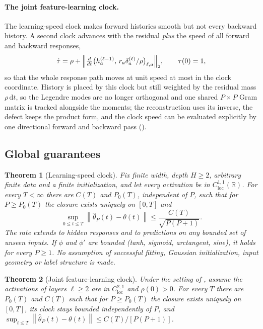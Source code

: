 \documentclass[11pt]{article}
\newtheorem{theorem}{Theorem}[section]
\theoremstyle{definition}
\theoremstyle{remark}
\newcommand{\R}{\mathbb{R}}
\newcommand{\norm}[1]{\left\lVert #1\right\rVert}
\newcommand{\dd}{\,\mathrm{d}}
\begin{document}
\paragraph{The joint feature-learning clock.}
The learning-speed clock makes forward histories smooth but not every backward
history.  A second clock advances with the residual \emph{plus} the speed of all
forward and backward responses,
\begin{equation}
 \dot\tau=\rho+\Bigl\|\tfrac{d}{dt}\bigl(h_a^{(\ell-1)},\,r_a\delta_a^{(\ell)}/\rho\bigr)_{\ell,a}\Bigr\|_2,
 \qquad\tau(0)=1,                                         \label{eq:new-clock}
\end{equation}
so that the whole response path moves at unit speed at most in the clock
coordinate.  History is placed by this clock but still weighted by the residual
mass $\rho\dd t$, so the Legendre modes are no longer orthogonal and one shared
$P\times P$ Gram matrix is tracked alongside the moments; the reconstruction uses
its inverse, the defect keeps the product form, and the clock speed can be
evaluated explicitly by one directional forward and backward pass
().

\subsection{Global guarantees}

\begin{theorem}[Learning-speed clock]
\label{thm:old}
Fix finite width, depth $H\ge2$, arbitrary finite data and a finite
initialization, and let every activation be in $C^{1,1}_{\mathrm{loc}}(\R)$.  For
every $T<\infty$ there are $C(T)$ and $P_0(T)$, independent of $P$, such that for
$P\ge P_0(T)$ the closure exists uniquely on $[0,T]$ and
\[
 \sup_{0\le t\le T}\norm{\widehat\theta_P(t)-\theta(t)}
 \le \frac{C(T)}{\sqrt{P(P+1)}} .
\]
The rate extends to hidden responses and to predictions on any bounded set of
unseen inputs.  If $\phi$ and $\phi'$ are bounded (tanh, sigmoid, arctangent,
sine), it holds for every $P\ge1$.  No assumption of successful fitting, Gaussian
initialization, input geometry or label structure is made.
\end{theorem}

\begin{theorem}[Joint feature-learning clock]
\label{thm:new}
Under the setting of , assume the activations of layers $\ell\ge2$
are in $C^{2,1}_{\mathrm{loc}}$ and $\rho(0)>0$.  For every $T$ there are $P_0(T)$
and $C(T)$ such that for $P\ge P_0(T)$ the closure exists uniquely on $[0,T]$,
its clock stays bounded independently of $P$, and
$\sup_{t\le T}\norm{\widehat\theta_P(t)-\theta(t)}\le C(T)/[P(P+1)]$.
\end{theorem}
\end{document}

